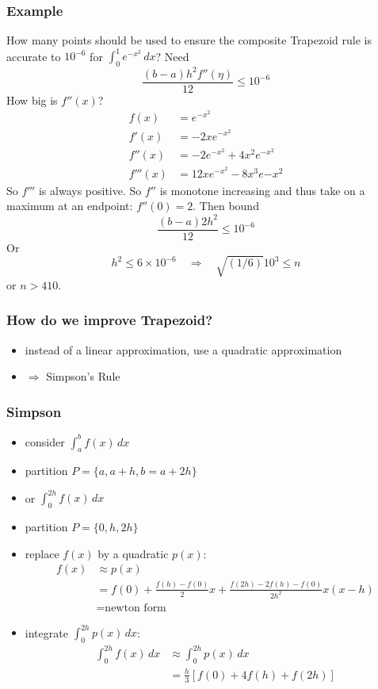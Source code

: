 \documentclass[10pt]{beamer}
\begin{document}
\begin{frame}[shrink]
\frametitle{Example}
How many points should be used to ensure the composite Trapezoid rule is
accurate to $10^{-6}$ for $\int_0^1 e^{-x^2}\,dx$?
\bigskip
Need 
\begin{equation*}
\frac{(b-a) h^2 f''(\eta)}{12} \leq 10^{-6}
\end{equation*}
How big is $f''(x)$?
\begin{align*}
  f(x) &= e^{-x^2}\\
  f'(x) &=-2xe^{-x^2}\\
  f''(x) &=-2e^{-x^2}+4x^2e^{-x^2}\\
  f'''(x) &=12xe^{-x^2}-8x^3e{-x^2}
\end{align*}
So $f'''$ is always positive.  So $f''$ is monotone increasing and thus
take on a maximum at an endpoint: $f''(0) = 2$. Then bound
\begin{equation*}
\frac{(b-a) 2 h^2}{12} \leq 10^{-6}
\end{equation*}
Or
\begin{equation*}
h^2 \leq 6 \times 10^{-6} \quad \Rightarrow \quad \sqrt{(1/6)} 10^{3} \leq n
\end{equation*}
or $n>410$.
\end{frame}
\begin{frame}
\frametitle{How do we improve Trapezoid?}
  \begin{itemize}
  \item instead of a linear approximation, use a quadratic approximation
  \item $\Rightarrow$ Simpson's Rule
\end{itemize}
\end{frame}
\begin{frame}
\frametitle{Simpson}
  \begin{itemize}
  \item consider $\int_{a}^{b} f(x)\,dx$
  \item partition $P =\{a,a+h,b=a+2h\}$
  \item or $\int_{0}^{2h} f(x)\,dx$
  \item partition $P =\{0,h,2h\}$
  \item replace $f(x)$ by a quadratic $p(x)$:
    \begin{align*}
      f(x) & \approx p(x)\\
           & = f(0) + \frac{f(h)-f(0)}{2} x + \frac{f(2h)-2f(h)-f(0)}{2h^2} x (x-h)\\
          & = \text{newton form}
    \end{align*}
  \item integrate $\int_{0}^{2h} p(x)\,dx$:
  \begin{align*}
  \int_{0}^{2h} f(x)\,dx &\approx \int_{0}^{2h} p(x)\,dx\\
                         &= \frac{h}{3}\left[f(0) + 4f(h) + f(2h)\right]
  \end{align*}
        
\end{itemize}
\end{frame}
\end{document}
